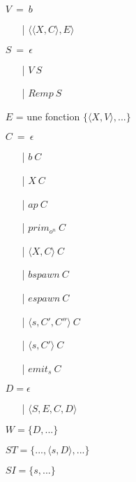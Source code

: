 \documentclass[10pt,a4paper]{report}
\begin{document}
\begin{itemize}
\item[] $V~=~b$
  \begin{itemize}
  \item[|] $\langle\langle X,C\rangle,E\rangle$
  \end{itemize}
\item[] $S~=~\epsilon$ 
  \begin{itemize}
  \item[|] $V~S$ 
  \item[|] $Remp~S$
  \end{itemize}
\item[] $E$ = une fonction $\{\langle X,V\rangle,...\}$
\item[] $C~=~\epsilon$ 
  \begin{itemize}
  \item[|] $b~C$
  \item[|] $X~C$
  \item[|] $ap~C$
  \item[|] $prim_{o^{n}}~C$  
  \item[|] $\langle X,C\rangle~C$
  \item[|] $bspawn~C$ 
  \item[|] $espawn~C$
  \item[|] $\langle s,C',C''\rangle~C$
  \item[|] $\langle s,C'\rangle~C$ 
  \item[|] $emit_{s}~C$ 
  \end{itemize}
\item[] $D = \epsilon$
  \begin{itemize}
  \item[|] $\langle S,E,C,D\rangle$ 
  \end{itemize}
\item[] $W = \{D,...\}$
\item[] $ST = \{...,\langle s,D\rangle,...\}$
\item[] $SI = \{ s,...\}$
\end{itemize}
\bigbreak
\bigbreak
\end{document}

